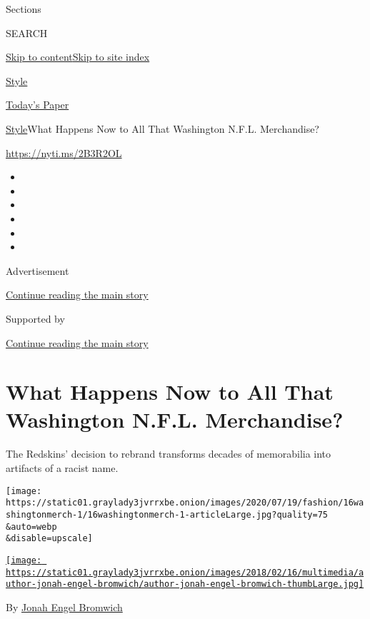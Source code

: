 Sections

SEARCH

\protect\hyperlink{site-content}{Skip to
content}\protect\hyperlink{site-index}{Skip to site index}

\href{https://www.nytimes3xbfgragh.onion/section/style}{Style}

\href{https://myaccount.nytimes3xbfgragh.onion/auth/login?response_type=cookie\&client_id=vi}{}

\href{https://www.nytimes3xbfgragh.onion/section/todayspaper}{Today's
Paper}

\href{/section/style}{Style}\textbar{}What Happens Now to All That
Washington N.F.L. Merchandise?

\url{https://nyti.ms/2B3R2OL}

\begin{itemize}
\item
\item
\item
\item
\item
\item
\end{itemize}

Advertisement

\protect\hyperlink{after-top}{Continue reading the main story}

Supported by

\protect\hyperlink{after-sponsor}{Continue reading the main story}

\hypertarget{what-happens-now-to-all-that-washington-nfl-merchandise}{%
\section{What Happens Now to All That Washington N.F.L.
Merchandise?}\label{what-happens-now-to-all-that-washington-nfl-merchandise}}

The Redskins' decision to rebrand transforms decades of memorabilia into
artifacts of a racist name.

\texttt{[image: https://static01.graylady3jvrrxbe.onion/images/2020/07/19/fashion/16washingtonmerch-1/16washingtonmerch-1-articleLarge.jpg?quality=75\\\&auto=webp\\\&disable=upscale]}

\href{https://www.nytimes3xbfgragh.onion/by/jonah-engel-bromwich}{\texttt{[image: https://static01.graylady3jvrrxbe.onion/images/2018/02/16/multimedia/author-jonah-engel-bromwich/author-jonah-engel-bromwich-thumbLarge.jpg]}}

By
\href{https://www.nytimes3xbfgragh.onion/by/jonah-engel-bromwich}{Jonah
Engel Bromwich}

